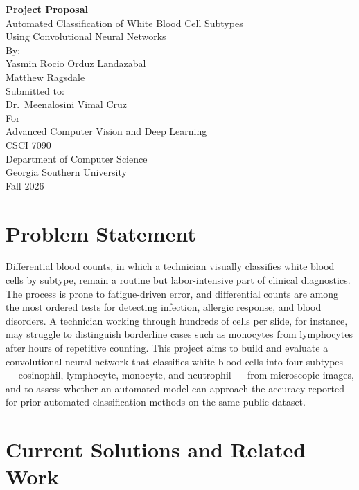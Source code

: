 \documentclass[11pt]{article}
\begin{document}
\begin{titlepage}
\centering
\vspace*{1.2cm}

{\LARGE\bfseries Project Proposal}\\[0.7cm]
{\Large Automated Classification of White Blood Cell Subtypes\\ Using Convolutional Neural Networks}\\[1.6cm]

By:\\[0.35cm]
Yasmin Rocio Orduz Landazabal\\
Matthew Ragsdale\\[1.4cm]

Submitted to:\\[0.35cm]
Dr.\ Meenalosini Vimal Cruz\\[1.4cm]

For\\[0.35cm]
Advanced Computer Vision and Deep Learning\\
CSCI 7090\\[1.6cm]

Department of Computer Science\\
Georgia Southern University\\
Fall 2026
\end{titlepage}

\section{Problem Statement}

Differential blood counts, in which a technician visually classifies white blood cells by subtype, remain a routine but labor-intensive part of clinical diagnostics. The process is prone to fatigue-driven error, and differential counts are among the most ordered tests for detecting infection, allergic response, and blood disorders. A technician working through hundreds of cells per slide, for instance, may struggle to distinguish borderline cases such as monocytes from lymphocytes after hours of repetitive counting. This project aims to build and evaluate a convolutional neural network that classifies white blood cells into four subtypes --- eosinophil, lymphocyte, monocyte, and neutrophil --- from microscopic images, and to assess whether an automated model can approach the accuracy reported for prior automated classification methods on the same public dataset.

\section{Current Solutions and Related Work}
\end{document}
